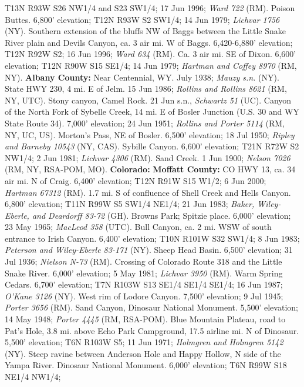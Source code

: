 T13N R93W S26 NW1/4 and S23 SW1/4; 17 Jun 1996; \textit{Ward 722} (RM).
Poison Buttes. 6,800’ elevation; T12N R93W S2 SW1/4; 14 Jun 1979;
\textit{Lichvar 1756} (NY).
Southern extension of the bluffs NW of Baggs between the Little Snake River
plain and Devils Canyon, ca. 3 air mi. W of Baggs. 6,420-6,880’ elevation;
T12N R92W S2; 16 Jun 1996; \textit{Ward 634} (RM).
Ca. 3 air mi. SE of Dixon. 6,600’ elevation; T12N R90W S15 SE1/4; 14 Jun 1979;
\textit{Hartman and Coffey 8970} (RM, NY).
  \textbf{Albany County:}
Near Centennial, WY. July 1938; \textit{Mauzy s.n.} (NY).
State HWY 230, 4 mi. E of Jelm. 15 Jun 1986;
\textit{Rollins and Rollins 8621} (RM, NY, UTC).
Stony canyon, Camel Rock. 21 Jun s.n., \textit{Schwartz 51} (UC).
Canyon of the North Fork of Sybelle Creek, 14 mi. E of Bosler Junction (U.S. 30
and WY State Route 34). 7,000’ elevation; 24 Jun 1951;
\textit{Rollins and Porter 5114} (RM, NY, UC, US).
Morton’s Pass, NE of Bosler. 6,500’ elevation; 18 Jul 1950;
\textit{Ripley and Barneby 10543} (NY, CAS).
Sybille Canyon. 6,600’ elevation; T21N R72W S2 NW1/4; 2 Jun 1981;
\textit{Lichvar 4306} (RM).
Sand Creek. 1 Jun 1900; \textit{Nelson 7026} (RM, NY, RSA-POM, MO).
  \textbf{Colorado:}
  \textbf{Moffatt County:}
CO HWY 13, ca. 34 air mi. N of Craig. 6,400' elevation; T12N R91W S15 W1/2;
6 Jun 2000; \textit{Hartman 67312} (RM).
1.7 mi. S of confluence of Shell Creek and Hells Canyon. 6,800' elevation;
T11N R99W S5 SW1/4 NE1/4; 21 Jun 1983;
\textit{Baker, Wiley-Eberle, and Deardorff 83-72} (GH).
Browns Park; Spitzie place. 6,000' elevation; 23 May 1965;
\textit{MacLeod 358} (UTC).
Bull Canyon, ca. 2 mi. WSW of south entrance to Irish Canyon. 6,400' elevation;
T10N R101W S32 SW1/4; 8 Jun 1983; \textit{Peterson and Wiley-Eberle 83-171} (NY).
Sheep Head Basin. 6,500' elevation; 31 Jul 1936; \textit{Nielson N-73} (RM).
Crossing of Colorado Route 318 and the Little Snake River. 6,000' elevation;
5 May 1981; \textit{Lichvar 3950} (RM).
Warm Spring Cedars. 6,700' elevation; T7N R103W S13 SE1/4 SE1/4 SE1/4;
16 Jun 1987; \textit{O'Kane 3126} (NY).
West rim of Lodore Canyon. 7,500' elevation; 9 Jul 1945;
\textit{Porter 3656} (RM).
Sand Canyon, Dinosaur National Monument. 5,500' elevation; 14 May 1948;
\textit{Porter 4445} (RM, RSA-POM).
Blue Mountain Plateau, road to Pat's Hole, 3.8 mi. above Echo Park Campground,
17.5 airline mi. N of Dinosaur. 5,500' elevation; T6N R103W S5; 11 Jun 1971;
\textit{Holmgren and Holmgren 5142} (NY).
Steep ravine between Anderson Hole and Happy Hollow, N side of the Yampa River.
Dinosaur National Monument. 6,000' elevation; T6N R99W S18 NE1/4 NW1/4;
